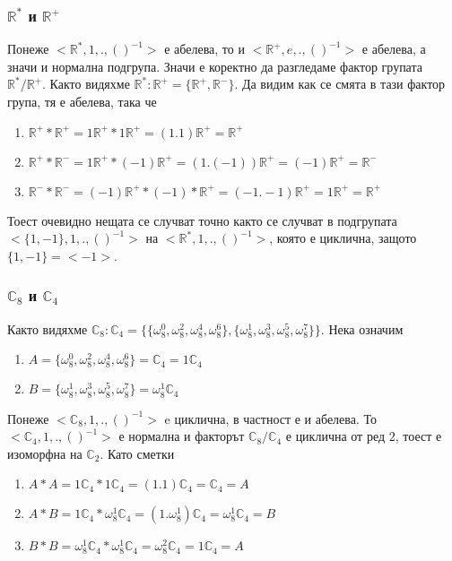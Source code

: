 \documentclass[12pt]{article}
\begin{document}
\subsubsection{\(\mathbb{R}^*\) и \(\mathbb{R}^+\)}
Понеже \(<\mathbb{R}^*, 1, . , ()^{-1}>\) е абелева, то и \(<\mathbb{R}^+, e, . , ()^{-1}>\) е абелева, а значи и нормална подгрупа.
Значи е коректно да разгледаме фактор групата \(\mathbb{R}^* / \mathbb{R}^+\).
Както видяхме \(\mathbb{R}^* : \mathbb{R}^+ = \{\mathbb{R}^+, \mathbb{R}^-\}\).
Да видим как се смята в тази фактор група, тя е абелева, така че
\begin{enumerate}
    \item \(\mathbb{R}^+ * \mathbb{R}^+ = 1\mathbb{R}^+ * 1\mathbb{R}^+ = (1.1)\mathbb{R}^+ = \mathbb{R}^+\)
    \item \(\mathbb{R}^+ * \mathbb{R}^- = 1\mathbb{R}^+ * (-1)\mathbb{R}^+ = (1.(-1))\mathbb{R}^+ = (-1)\mathbb{R}^+ = \mathbb{R}^-\)
    \item \(\mathbb{R}^- * \mathbb{R}^- = (-1)\mathbb{R}^+ * (-1)*\mathbb{R}^+ = (-1.-1)\mathbb{R}^+ = 1\mathbb{R}^+ = \mathbb{R}^+\)
\end{enumerate}
Тоест очевидно нещата се случват точно както се случват в подгрупата \(<\{1, -1\}, 1, . , ()^{-1}>\) на \(<\mathbb{R}^*, 1, . , ()^{-1}>\), която е циклична, защото \(\{1, -1\} = <-1>\).
\subsubsection{\(\mathbb{C}_8\) и \(\mathbb{C}_4\)}
Както видяхме \(\mathbb{C}_8 : \mathbb{C}_4 = \{\{\omega_8^0, \omega_8^2, \omega_8^4, \omega_8^6\}, \{\omega_8^1, \omega_8^3, \omega_8^5, \omega_8^7\}\}\).
Нека означим
\begin{enumerate}
    \item \(A = \{\omega_8^0, \omega_8^2, \omega_8^4, \omega_8^6\} = \mathbb{C}_4 = 1\mathbb{C}_4\)
    \item \(B = \{\omega_8^1, \omega_8^3, \omega_8^5, \omega_8^7\} = \omega_8^1\mathbb{C}_4\)
\end{enumerate}
Понеже \(<\mathbb{C}_8, 1, . , ()^{-1}>\) e циклична, в частност е и абелева.
То \(<\mathbb{C}_4, 1, . , ()^{-1}>\) е нормална и факторът \(\mathbb{C}_8 / \mathbb{C}_4\) е циклична от ред \(2\), тоест е изоморфна на \(\mathbb{C}_2\).
Като сметки
\begin{enumerate}
    \item \(A * A = 1\mathbb{C}_4 * 1\mathbb{C}_4 = (1.1)\mathbb{C}_4 = \mathbb{C}_4 = A\)
    \item \(A * B = 1\mathbb{C}_4 * \omega_8^1\mathbb{C}_4 = (1.\omega_8^1)\mathbb{C}_4 = \omega_8^1\mathbb{C}_4 = B\)
    \item \(B * B = \omega_8^1\mathbb{C}_4 * \omega_8^1\mathbb{C}_4 = \omega_8^2\mathbb{C}_4 = 1\mathbb{C}_4 = A\)
\end{enumerate}
\end{document}
